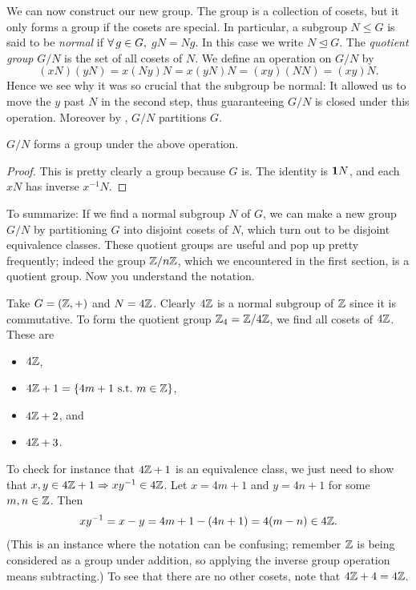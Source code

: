 We can now construct our new group. The group is a collection of cosets, but
it only forms a group if the cosets are special. In particular,
a subgroup $N\le G$ is said to be {\it normal} if 
$\operatorname{\forall} g\in G,$ $gN=Ng$. In this case we write $N\unlhd G$. The 
{\it quotient group} $G/N$ is the set of all cosets of 
$N$. We define an operation on $G/N$ by
\begin{equation}
  (xN)(yN)=x(Ny)N=x(yN)N=(xy)(NN)=(xy)N.
\end{equation}
Hence we see why it was so crucial that the subgroup be normal: It allowed
us to move the $y$ past $N$ in the second step, thus guaranteeing $G/N$ is
closed under this operation.
Moreover by , $G/N$ partitions $G$.
\begin{proposition}{}{}
  $G/N$ forms a group under the above operation.
  \begin{proof}
    This is pretty clearly a group because $G$ is. The identity is ${\mathbf 1} N$,
    and each $xN$ has inverse $x^{-1}N$.
  \end{proof}
\end{proposition}
To summarize: If we find a normal subgroup $N$ of $G$, we can make a new group
$G/N$ by partitioning $G$ into disjoint cosets of $N$, which turn out to be
disjoint equivalence classes. These quotient groups are useful and pop up
pretty frequently; indeed the group $\mathbb{Z}/n\mathbb{Z}$, which we
encountered in the first section, is a quotient group. Now you understand the
notation.
\begin{example*}{}{}
  Take $G=(\mathbb{Z},+)$ and $N=4\mathbb{Z}$. Clearly $4\mathbb{Z}$ is a
  normal subgroup of $\mathbb{Z}$ since it is commutative. To form the 
  quotient group $\mathbb{Z}_4=\mathbb{Z}/4\mathbb{Z}$, we find all cosets of $4\mathbb{Z}$.
  These are
  \begin{itemize}
    \item $4\mathbb{Z}$,
    \item $4\mathbb{Z}+1=\left\{4m+1~\text{s.t.}~ m\in\mathbb{Z}\right\}$,
    \item $4\mathbb{Z}+2$, and
    \item $4\mathbb{Z}+3$.
  \end{itemize}
  To check for instance that $4\mathbb{Z}+1$ is an equivalence class, we just
  need to show that $x,y\in4\mathbb{Z}+1\Rightarrow xy^{-1}\in4\mathbb{Z}$.
  Let $x=4m+1$ and $y=4n+1$ for some $m,n\in\mathbb{Z}$. Then
  $$xy^{-1}=x-y=4m+1-(4n+1)=4(m-n)\in4\mathbb{Z}.$$
  (This is an instance where the notation can be confusing; remember
  $\mathbb{Z}$ is being considered as a group under addition, so applying the
  inverse group operation means subtracting.) To see that there are no other
  cosets, note that $4\mathbb{Z}+4=4\mathbb{Z}$.
\end{example*}


